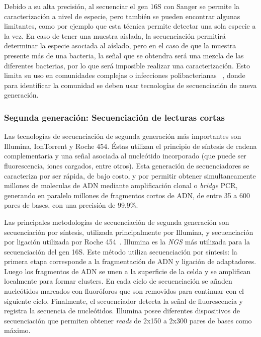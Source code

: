 Debido a su alta precisión, al secuenciar el gen 16S con Sanger se permite la caracterización a nivel de especie, pero también se pueden encontrar algunas limitantes, como por ejemplo que esta técnica permite detectar una sola especie a la vez. En caso de tener una muestra aislada, la secuenciación permitirá determinar la especie asociada al aíslado, pero en el caso de que la muestra presente más de una bacteria, la señal que se obtendra será una mezcla de las diferentes bacterias, por lo que será imposible realizar una caracterización. 
Esto limita su uso en comunidades complejas o infecciones polibacterianas ~\cite{lamoureux2022prospective}, donde para identificar la comunidad se deben usar tecnologías de secuenciación de nueva generación.
\subsubsection{Segunda generación: Secuenciación de lecturas cortas}
Las tecnologías de secuenciación de segunda generación más importantes son Illumina, IonTorrent y Roche 454. Éstas utilizan el principio de síntesis de cadena complementaria y una señal asociada al nucleótido incorporado (que puede ser fluorescencia, iones cargados, entre otros). %
Esta generación de secuenciadores se caracteriza por ser rápida, de bajo costo, y por permitir obtener simultaneamente millones de moleculas de ADN mediante amplificación clonal o \textit{bridge} PCR, generando en paralelo millones de fragmentos cortos de ADN, de entre 35 a 600 pares de bases, con una precisión de 99.9\%.%


Las principales metodologías de secuenciación de segunda generación son secuenciación por síntesis, utilizada principalmente por Illumina, y secuenciación por ligación utilizada por Roche 454~\cite{mardis2008next}.
Illumina es la \textit{NGS} más utilizada para la secuenciación del gen 16S. Este método utiliza secuenciación por síntesis: la primera etapa corresponde a la fragmentación de ADN y ligación de adaptadores.
Luego los fragmentos de ADN se unen a la superficie de la celda y se amplifican localmente para formar clusters. 
En cada ciclo de secuenciación se añaden nucleótidos marcados con fluoróforos que son removidos para continuar con el siguiente ciclo.
Finalmente, el secuenciador detecta la señal de fluorescencia y registra la secuencia de nucleótidos. 
Illumina posee diferentes dispositivos de secuenciación que permiten obtener \textit{reads} de 2x150 a 2x300 pares de bases como máximo.

